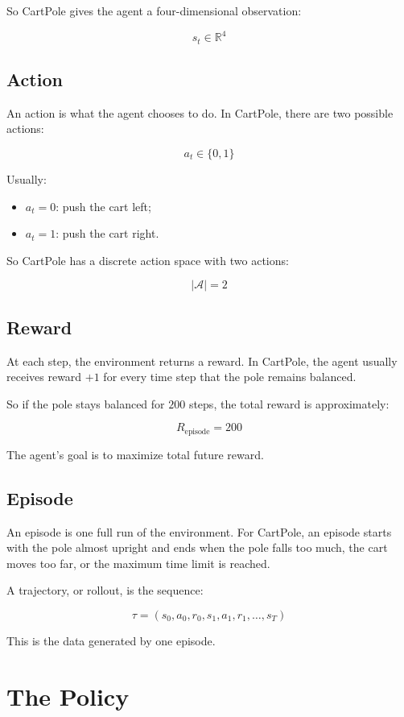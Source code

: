 \documentclass[11pt]{article}
\begin{document}
So CartPole gives the agent a four-dimensional observation:

\[
\boxed{s_t \in \mathbb{R}^4}
\]

\subsection{Action}

An action is what the agent chooses to do.
In CartPole, there are two possible actions:

\[
 a_t \in \{0,1\}
\]

Usually:

\begin{itemize}[leftmargin=2em]
    \item $a_t = 0$: push the cart left;
    \item $a_t = 1$: push the cart right.
\end{itemize}

So CartPole has a discrete action space with two actions:

\[
\boxed{|\mathcal{A}| = 2}
\]

\subsection{Reward}

At each step, the environment returns a reward.
In CartPole, the agent usually receives reward $+1$ for every time step that the pole remains balanced.

So if the pole stays balanced for $200$ steps, the total reward is approximately:

\[
 R_{\text{episode}} = 200
\]

The agent's goal is to maximize total future reward.

\subsection{Episode}

An episode is one full run of the environment.
For CartPole, an episode starts with the pole almost upright and ends when the pole falls too much, the cart moves too far, or the maximum time limit is reached.

A trajectory, or rollout, is the sequence:

\[
\tau = (s_0, a_0, r_0, s_1, a_1, r_1, \dots, s_T)
\]

This is the data generated by one episode.

\section{The Policy}
\end{document}
